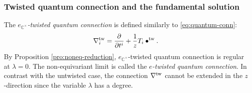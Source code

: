 \documentclass[11pt]{amsart}
\newtheorem{pro}[thm]{Proposition} %
\theoremstyle{definition} %
\theoremstyle{remark} %
\newcommand{\CC}{\mathbb C}
\newcommand{\nar}{\operatorname{nar}}
\newcommand{\la}{\lambda}
\newcommand{\tw}{{\rm tw}}
\def\wt{\widetilde}
\def\parfrac#1#2{\frac{\partial #1}{\partial #2}}
\newcommand{\bmu}{\boldsymbol{\mu}}
\newcommand{\Nar}{\operatorname{\mathsf{Nar}}}
\newcommand{\ext}{{\operatorname{ext}}}
\newcommand{\FJRW}{{\operatorname{FJRW}}}
\begin{document}


\subsubsection{Twisted quantum connection and 
the fundamental solution} 
\label{subsubsec:tw-quantum-fund} 
The \emph{$e_{\CC^\times}$-twisted quantum connection}  
is defined similarly to \eqref{eq:quantum-conn}:  
\[
\nabla^\tw_i = \parfrac{}{t^i} + \frac{1}{z} T_i \bullet^\tw. 
\]
By Proposition \ref{pro:noneq-reduction}, 
$e_{\CC^\times}$-twisted quantum connection 
is regular at $\lambda=0$. 
The non-equivariant limit is called 
the \emph{$e$-twisted quantum connection}. 
In contrast with the untwisted case, the connection $\nabla^\tw$ 
cannot be extended in the $z$-direction since 
the variable $\lambda$ has a degree. 
\end{document}
